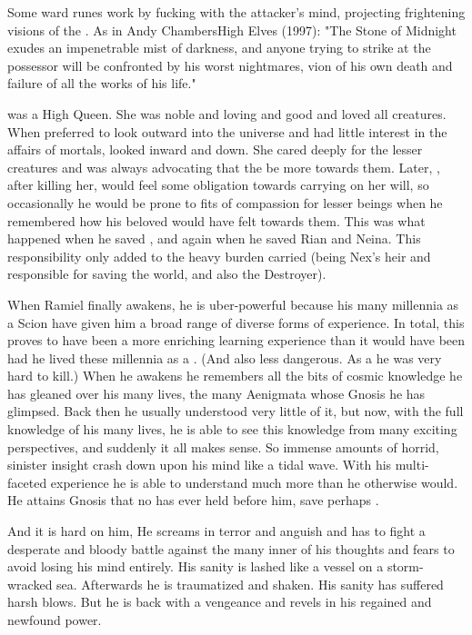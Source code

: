 Some \xs ward runes work by fucking with the attacker's mind, projecting frightening visions of the \xs.
As in Andy Chambers\dash{}High Elves (1997):
"The Stone of Midnight exudes an impenetrable mist of darkness, and anyone trying to strike at the possessor will be confronted by his worst nightmares, vion of his own death and failure of all the works of his life."

\Rystessakhin was a High Queen.
She was noble and loving and good and loved all creatures.
When \Ishnaruchaefir preferred to look outward into the universe and had little interest in the affairs of mortals, \Rystessakhin looked inward and down. 
She cared deeply for the lesser creatures and was always advocating that the \dragons be more \humane towards them.
Later, \Ishnaruchaefir, after killing her, would feel some obligation towards carrying on her will, so occasionally he would be prone to fits of compassion for lesser beings when he remembered how his beloved would have felt towards them.
This was what happened when he saved \Criseis, and again when he saved Rian and Neina.
This responsibility only added to the heavy burden \Ishnaruchaefir carried (being Nex's heir and responsible for saving the world, and also the Destroyer).

When Ramiel finally awakens, he is uber-powerful because his many millennia as a Scion have given him a broad range of diverse forms of experience. 
In total, this proves to have been a more enriching learning experience than it would have been had he lived these millennia as a \resphan. 
(And also less dangerous.
As a \malach he was very hard to kill.)
When he awakens he remembers all the bits of cosmic knowledge he has gleaned over his many lives, the many Aenigmata whose Gnosis he has glimpsed. 
Back then he usually understood very little of it, but now, with the full knowledge of his many lives, he is able to see this knowledge from many exciting perspectives, and suddenly it all makes sense.
So immense amounts of horrid, sinister insight crash down upon his mind like a tidal wave.
With his multi-faceted experience he is able to understand much more than he otherwise would.
He attains Gnosis that no \resphan has ever held before him, save perhaps \Azraid.

And it is hard on him,
He screams in terror and anguish and has to fight a desperate and bloody battle against the many inner \daemons of his thoughts and fears to avoid losing his mind entirely.
His sanity is lashed like a vessel on a storm-wracked sea.
Afterwards he is traumatized and shaken. 
His sanity has suffered harsh blows.
But he is back with a vengeance and revels in his regained and newfound power.

